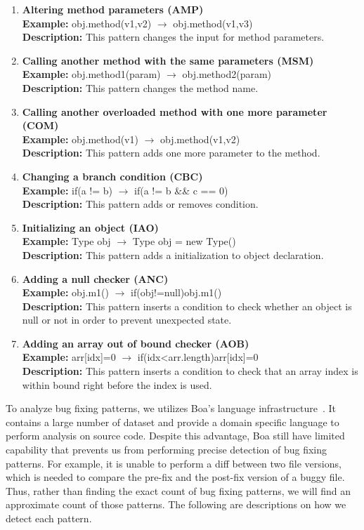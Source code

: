 \documentclass{sig-alternate-05-2015}
\begin{document}
  \begin{enumerate}
	\item {\bf Altering method parameters (AMP)}\\
	{\bf Example:} obj.method(v1,v2) $\rightarrow$ obj.method(v1,v3)\\
	{\bf Description:} This pattern changes the input for method parameters.
	\item {\bf Calling another method with the same parameters (MSM)}\\
	{\bf Example:} obj.method1(param) $\rightarrow$ obj.method2(param)\\
	{\bf Description:} This pattern changes the method name.
	\item {\bf Calling another overloaded method with one more parameter (COM)}\\
	{\bf Example:} obj.method(v1) $\rightarrow$ obj.method(v1,v2)\\
	{\bf Description:} This pattern adds one more parameter to the method.
	\item {\bf Changing a branch condition (CBC)}\\
	{\bf Example:} if(a != b) $\rightarrow$ if(a != b \&\& c == 0)\\
	{\bf Description:} This pattern adds or removes condition.
	\item {\bf Initializing an object (IAO)}\\
	{\bf Example:} Type obj $\rightarrow$ Type obj = new Type()\\
	{\bf Description:} This pattern adds a initialization to object declaration.
	\item {\bf Adding a null checker (ANC)}\\
	{\bf Example:} obj.m1() $\rightarrow$ if(obj!=null){obj.m1()}\\
	{\bf Description:} This pattern inserts a condition to check whether an object is null or not in order to prevent unexpected state.
	\item {\bf Adding an array out of bound checker (AOB)}\\
	{\bf Example:} arr[idx]=0 $\rightarrow$ if(idx<arr.length){arr[idx]=0}\\
	{\bf Description:} This pattern inserts a condition to check that an array index is within bound right before the index is used.
\end{enumerate}

To analyze bug fixing patterns, we utilizes Boa's language
infrastructure~\cite{dyer2013}. It contains a large number of dataset and provide
a domain specific language to perform analysis on source code. Despite this
advantage, Boa still have limited capability that prevents us from performing
precise detection of bug fixing patterns. For example, it is unable to perform a
diff between two file versions, which is needed to compare the pre-fix and the
post-fix version of a buggy file. Thus, rather than finding the exact count of
bug fixing patterns, we will find an approximate count of those patterns. The
following are descriptions on how we detect each pattern.
\end{document}
